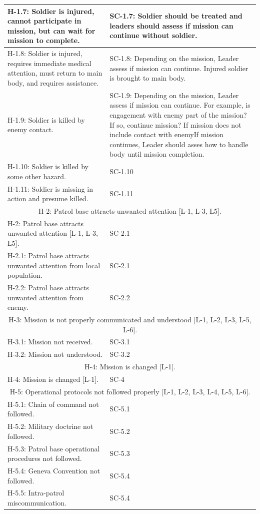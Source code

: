\documentclass[../../main/main.tex]{subfiles}
\begin{document}
\begin{longtable}[h]{ | m{7.5cm} |  m{7.5cm} | }
\hline
H-1.7: Soldier is injured, cannot participate in mission, but can wait for mission to complete.
& 
SC-1.7: Soldier should be treated and leaders should assess if mission can continue without soldier.  \\ 
\hline
H-1.8: Soldier is injured, requires immediate medical attention, must return to main body, and requires assistance.
& 
SC-1.8: Depending on the mission, Leader assess if mission can continue.  Injured soldier is brought to main body.  \\ 
\hline
H-1.9: Soldier is killed by enemy contact.
& 
SC-1.9: Depending on the mission, Leader assess if mission can continue.  For example, is engagement with enemy part of the mission?  If so, continue mission?  If mission does not include contact with enemyIf mission continues, Leader should asses how to handle body until mission completion.    \\ 
\hline
H-1.10: Soldier is killed by some other hazard.
& 
SC-1.10  \\ 
\hline
H-1.11: Soldier is missing in action and presume killed.
& 
SC-1.11  \\ 

\hline
\multicolumn{2}{|c|}{H-2: Patrol base attracts unwanted attention [L-1, L-3, L5].}\\
\hline
H-2: Patrol base attracts unwanted attention [L-1, L-3, L5].
& 
SC-2.1  \\ 
\hline
H-2.1: Patrol base attracts unwanted attention from local population.
& 
SC-2.1  \\ 
\hline
H-2.2: Patrol base attracts unwanted attention from enemy.
& 
SC-2.2  \\ 


\hline
\multicolumn{2}{|c|}{H-3: Mission is not properly communicated and understood [L-1, L-2, L-3, L-5, L-6].}\\
\hline
H-3.1: Mission not received.
& 
SC-3.1 \\
\hline
H-3.2: Mission not understood.
& 
SC-3.2 \\

\hline
\multicolumn{2}{|c|}{H-4: Mission is changed [L-1].}\\
\hline
H-4: Mission is changed [L-1].
& 
SC-4\\

\hline
\multicolumn{2}{|c|}{H-5: Operational protocols not followed properly [L-1, L-2, L-3, L-4, L-5, L-6].}\\
\hline
 H-5.1: Chain of command not followed.
 & 
SC-5.1\\
\hline
H-5.2: Military doctrine not followed.
 & 
SC-5.2\\
\hline
H-5.3: Patrol base operational procedures not followed.
 & 
SC-5.3\\
\hline
H-5.4: Geneva Convention not followed.
 & 
SC-5.4\\
\hline
H-5.5: Intra-patrol miscommunication.
 & 
SC-5.4\\


\end{longtable}
\end{document}
